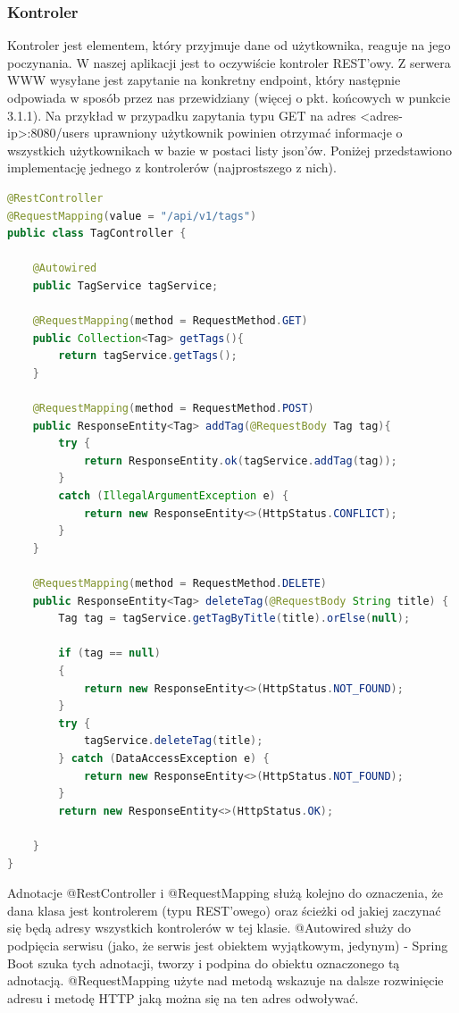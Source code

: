 \documentclass{report}
\begin{document}
			\subsubsection{Kontroler}
			
Kontroler jest elementem, który przyjmuje dane od użytkownika, reaguje na jego poczynania. W naszej aplikacji jest to oczywiście kontroler REST'owy. Z serwera WWW wysyłane jest zapytanie na konkretny endpoint, który następnie odpowiada w sposób przez nas przewidziany (więcej o pkt. końcowych w punkcie 3.1.1). Na przykład w przypadku zapytania typu GET na adres <adres-ip>:8080/users	uprawniony użytkownik powinien otrzymać informacje o wszystkich użytkownikach w bazie w postaci listy json'ów. Poniżej przedstawiono implementację jednego z kontrolerów (najprostszego z nich).


\begin{lstlisting}[language=Java, breaklines]
@RestController
@RequestMapping(value = "/api/v1/tags")
public class TagController {

    @Autowired
    public TagService tagService;

    @RequestMapping(method = RequestMethod.GET)
    public Collection<Tag> getTags(){
        return tagService.getTags();
    }

    @RequestMapping(method = RequestMethod.POST)
    public ResponseEntity<Tag> addTag(@RequestBody Tag tag){
        try {
            return ResponseEntity.ok(tagService.addTag(tag));
        }
        catch (IllegalArgumentException e) {
            return new ResponseEntity<>(HttpStatus.CONFLICT);
        }
    }

    @RequestMapping(method = RequestMethod.DELETE)
    public ResponseEntity<Tag> deleteTag(@RequestBody String title) {
        Tag tag = tagService.getTagByTitle(title).orElse(null);

        if (tag == null)
        {
            return new ResponseEntity<>(HttpStatus.NOT_FOUND);
        }
        try {
            tagService.deleteTag(title);
        } catch (DataAccessException e) {
            return new ResponseEntity<>(HttpStatus.NOT_FOUND);
        }
        return new ResponseEntity<>(HttpStatus.OK);

    }
}
\end{lstlisting}
			
Adnotacje @RestController i @RequestMapping służą kolejno do oznaczenia, że dana klasa jest kontrolerem (typu REST'owego) oraz ścieżki od jakiej zaczynać się będą adresy wszystkich kontrolerów w tej klasie. @Autowired służy do podpięcia serwisu (jako, że serwis jest obiektem wyjątkowym, jedynym) - Spring Boot szuka tych adnotacji, tworzy i podpina do obiektu oznaczonego tą adnotacją. @RequestMapping użyte nad metodą wskazuje na dalsze rozwinięcie adresu i metodę HTTP jaką można się na ten adres odwoływać.
\end{document}
